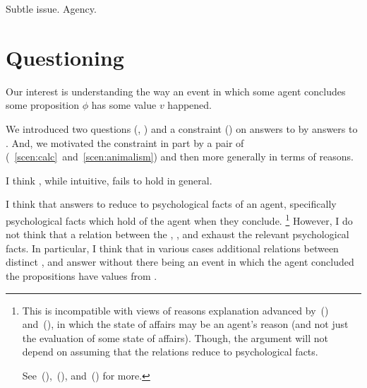 \begin{note}
  Subtle issue.
  Agency.
\end{note}

\section*{Questioning \issueInclusion{}}

\begin{note}
  Our interest is understanding the way an event in which some agent \vAgent{} concludes some proposition \(\phi\) has some value \(v\) happened.

  We introduced two questions (\qWhy{}, \qHow{}) and a constraint (\issueInclusion{}) on answers to \qWhy{} by answers to \qHow{}.
  And, we motivated the constraint in part by a pair of  (~\ref{scen:calc}~and~\ref{scen:animalism}) and then more generally in terms of reasons.

  I think \issueInclusion{}, while intuitive, fails to hold in general.
\end{note}

\begin{note}
  I think that answers to \qWhy{} reduce to psychological facts of an agent, specifically psychological facts which hold of the agent when they conclude.%
  \footnote{
    This is incompatible with views of reasons explanation advanced by~(\cite{Dancy:2000aa}) and~(\cite{Alvarez:2013aa}), in which the state of affairs may be an agent's reason (and not just the evaluation of some state of affairs).
    Though, the argument will not depend on assuming that the relations reduce to psychological facts.

    See~(\cite[413--418]{Hieronymi:2011aa}),~(\cite[3--5]{DOro:2013vh}), and~(\cite[\S2]{Alvarez:2017aa}) for more.
  }
  However, I do not think that a relation between the , , and \pool{} exhaust the relevant psychological facts.
  In particular, I think that in various cases additional relations between distinct ,  and  answer \qWhy{} without there being an event in which the agent concluded the propositions have values from .
\end{note}

